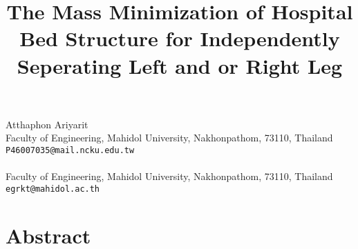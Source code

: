 

\title{The Mass Minimization of Hospital Bed Structure for  Independently Seperating Left and or Right Leg }
 \author{} \institute{}
\maketitle
\begin{center}
{\large Atthaphon Ariyarit}\\
Faculty of Engineering, Mahidol University, Nakhonpathom, 73110, Thailand\\
{\tt P46007035@mail.ncku.edu.tw}
\\ \\
Faculty of Engineering, Mahidol University, Nakhonpathom, 73110, Thailand\\
{\tt egrkt@mahidol.ac.th}

\end{center}

\section*{Abstract}

